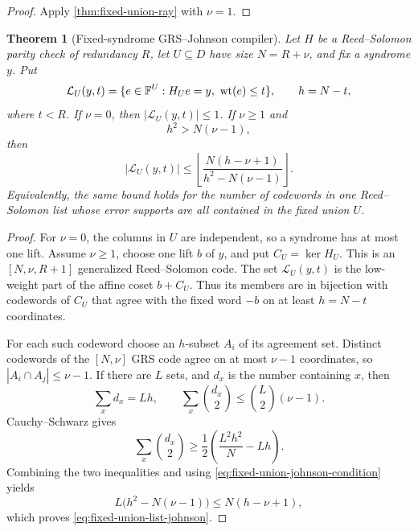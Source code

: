 \documentclass[11pt,a4paper]{amsart}
\numberwithin{equation}{section}
\newtheorem{theorem}{Theorem}[section]
\theoremstyle{remark}
\newcommand{\F}{\mathbb F}\newcommand{\B}{\mathbb B}\newcommand{\K}{\mathbb K}\newcommand{\Z}{\mathbb Z}
\begin{document}
\begin{proof}
Apply \cref{thm:fixed-union-ray} with \(\nu=1\).
\end{proof}

\begin{theorem}[Fixed-syndrome GRS--Johnson compiler]
\label{thm:fixed-union-list-johnson}
Let \(H\) be a Reed--Solomon parity check of redundancy \(R\), let
\(U\subseteq D\) have size \(N=R+\nu\), and fix a syndrome \(y\).  Put
\[
 \mathcal L_U(y,t)=
 \{e\in\F^U:H_Ue=y,\ \wt(e)\le t\},
 \qquad h=N-t,
\]
where \(t<R\).  If \(\nu=0\), then \(|\mathcal L_U(y,t)|\le1\).  If
\(\nu\ge1\) and
\begin{equation}
 h^2>N(\nu-1),                                      \label{eq:fixed-union-johnson-condition}
\end{equation}
then
\begin{equation}
 |\mathcal L_U(y,t)|
 \le
 \left\lfloor
 \frac{N(h-\nu+1)}{h^2-N(\nu-1)}
 \right\rfloor .                                  \label{eq:fixed-union-list-johnson}
\end{equation}
Equivalently, the same bound holds for the number of codewords in one
Reed--Solomon list whose error supports are all contained in the fixed
union \(U\).
\end{theorem}

\begin{proof}
For \(\nu=0\), the columns in \(U\) are independent, so a syndrome has at
most one lift.  Assume \(\nu\ge1\), choose one lift \(b\) of \(y\), and
put \(C_U=\ker H_U\).  This is an
\([N,\nu,R+1]\) generalized Reed--Solomon code.  The set
\(\mathcal L_U(y,t)\) is the low-weight part of the affine coset
\(b+C_U\).  Thus its members are in bijection with codewords of \(C_U\)
that agree with the fixed word \(-b\) on at least \(h=N-t\) coordinates.

For each such codeword choose an \(h\)-subset \(A_i\) of its agreement
set.  Distinct codewords of the \([N,\nu]\) GRS code agree on at most
\(\nu-1\) coordinates, so \(|A_i\cap A_j|\le\nu-1\).  If there are \(L\)
sets, and \(d_x\) is the number containing \(x\), then
\[
 \sum_xd_x=Lh,
 \qquad
 \sum_x\binom{d_x}{2}\le\binom L2(\nu-1).
\]
Cauchy--Schwarz gives
\[
 \sum_x\binom{d_x}{2}
 \ge\frac12\left(\frac{L^2h^2}{N}-Lh\right).
\]
Combining the two inequalities and using
\eqref{eq:fixed-union-johnson-condition} yields
\[
 L\bigl(h^2-N(\nu-1)\bigr)
 \le N(h-\nu+1),
\]
which proves \eqref{eq:fixed-union-list-johnson}.
\end{proof}
\end{document}
